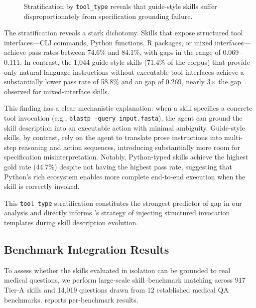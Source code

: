 \begin{figure}[t]
\caption{Stratification by \texttt{tool\_type} reveals that guide-style skills suffer disproportionately from specification grounding failure.}
\label{fig:tool_type}
\end{figure}

The stratification reveals a stark dichotomy.
Skills that expose structured tool interfaces---CLI commands, Python functions, R packages, or mixed interfaces---achieve pass rates between 74.6\% and 84.1\%, with \rbu gaps in the range of 0.069--0.111.
In contrast, the 1,044 guide-style skills (71.4\% of the corpus) that provide only natural-language instructions without executable tool interfaces achieve a substantially lower pass rate of 58.8\% and an \rbu gap of 0.269, nearly 3$\times$ the gap observed for mixed-interface skills.

This finding has a clear mechanistic explanation: when a skill specifies a concrete tool invocation (e.g., \texttt{blastp -query input.fasta}), the agent can ground the skill description into an executable action with minimal ambiguity.
Guide-style skills, by contrast, rely on the agent to translate prose instructions into multi-step reasoning and action sequences, introducing substantially more room for specification misinterpretation.
Notably, Python-typed skills achieve the highest gold rate (44.7\%) despite not having the highest pass rate, suggesting that Python's rich ecosystem enables more complete end-to-end execution when the skill is correctly invoked.

This \texttt{tool\_type} stratification constitutes the strongest predictor of \rbu gap in our analysis and directly informs \gepamed's strategy of injecting structured invocation templates during skill description evolution.

\subsection{Benchmark Integration Results}
\label{ssec:benchmark_integration}

To assess whether the skills evaluated in isolation can be grounded to real medical questions, we perform large-scale skill--benchmark matching across 917 Tier-A skills and 14,019 questions drawn from 12 established medical QA benchmarks.
 reports per-benchmark results.

